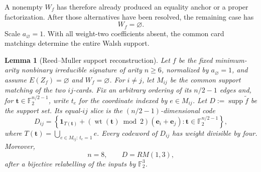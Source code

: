 \documentclass[11pt,letterpaper,onecolumn]{article}
\theoremstyle{plain}
\newtheorem{lemma}[lemma]{Lemma}
\theoremstyle{definition}
\theoremstyle{remark}
\newcommand{\Ftwo}{\mathbb F_2}
\newcommand{\wt}{\operatorname{wt}}
\newcommand{\supp}{\operatorname{supp}}
\newcommand{\one}{\mathbf 1}
\begin{document}
A nonempty \(W_f\) has therefore already produced an equality anchor or a
proper factorization.  After those alternatives have been resolved, the
remaining case has
\[
  W_f=\varnothing.
\]
Scale \(a_\varnothing=1\).  With all weight-two coefficients absent, the
common card matchings determine the entire Walsh support.

\begin{lemma}[Reed--Muller support reconstruction]
\label{lem:rm-local-slices}
\label{lem:rm-support-classification}
Let \(f\) be the fixed minimum-arity nonbinary irreducible signature of arity \(n\ge6\), normalized by
\(a_\varnothing=1\), and assume \(E(Z_f)=\varnothing\) and
\(W_f=\varnothing\).  For \(i\ne j\), let \(M_{ij}\) be the common support
matching of the two \(ij\)-cards.  Fix an arbitrary ordering of its
\(n/2-1\) edges and, for \({\mathbf t}\in\Ftwo^{n/2-1}\), write \(t_e\) for the
coordinate indexed by \(e\in M_{ij}\).  Let
\(D:=\supp\widetilde f\) be the support set.  Its equal-\(ij\) slice is
the \((n/2-1)\)-dimensional code
\begin{equation}
  D_{ij}=
  \left\{
    \one_{T({\mathbf t})}+(\wt({\mathbf t})\bmod2)({\mathbf{e}}_i+{\mathbf{e}}_j):
    {\mathbf t}\in\Ftwo^{n/2-1}
  \right\},
  \label{eq:rm-local-code}
\end{equation}
where
\(
  T({\mathbf t})=\bigcup_{e\in M_{ij}:\,t_e=1}e.
\)
Every codeword of \(D_{ij}\) has weight divisible by four.  Moreover,
\[
  n=8,
  \qquad
  D=RM(1,3),
\]
after a bijective relabelling of the inputs by \(\Ftwo^3\).
\end{lemma}
\end{document}
